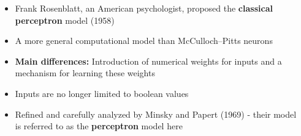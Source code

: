 \documentclass[serif, aspectratio=169]{beamer}
\begin{document}
\begin{frame}
\begin{columns}
\begin{overlayarea}{\textwidth}{\textheight}
\begin{center}
\end{center}
\end{overlayarea}

\begin{overlayarea}{\textwidth}{\textheight}
\begin{itemize}\justifying
\item<1-> Frank Rosenblatt, an American psychologist, proposed the \textbf{classical perceptron} model (1958)
\item<3-> A more general computational model than McCulloch–Pitts neurons
\item<4-> \textbf{Main differences:} Introduction of numerical weights for inputs and a mechanism for learning these weights 
\item<5-> Inputs are no longer limited to boolean values
\item<6-> Refined and carefully analyzed by Minsky and Papert (1969) - their model is referred to as the \textbf{perceptron} model here
\end{itemize}
\end{overlayarea}
\end{columns}
\end{frame}
\end{document}

